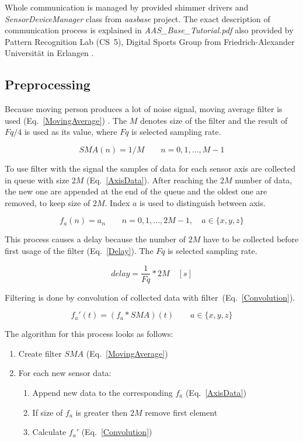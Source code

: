 \documentclass[conference]{IEEEtran}
\begin{document}
Whole communication is managed by provided shimmer drivers and \emph{SensorDeviceManager} class from \emph{aasbase} project. The exact description of communication process is explained in \emph{AAS\_Base\_Tutorial.pdf} also provided by Pattern Recognition Lab (CS~5), Digital Sports Group from Friedrich-Alexander Universität in Erlangen \cite{CS5}.


\subsection{Preprocessing}
Because moving person produces a lot of noise signal, moving average filter is used (Eq.~\ref{MovingAverage}) \cite{MovingAverage}.
The $M$ denotes size of the filter and the result of $Fq/4$ is used as its value, where $Fq$ is selected sampling rate.

\begin{equation}
	SMA(n) = 1/M\qquad  n = 0, 1, ..., M - 1
	\label{MovingAverage}
\end{equation}

To use filter with the signal the samples of data for each sensor axis are collected in queue with size  $2M$ (Eq.~\ref{AxisData}).
After reaching the $2M$ number of data, the new one are appended at the end of the queue and the oldest one are removed, to keep size of $2M$.
Index $a$ is used to distinguish between axis.

\begin{equation}
    f_a(n) = a_n\qquad n = 0, 1, ..., 2M - 1,\quad a \in \{x, y, z\}
    \label{AxisData}
\end{equation}

This process causes a delay because the number of $2M$ have to be collected before first usage of the filter (Eq.~\ref{Delay}). The $Fq$ is selected sampling rate.

\begin{equation}
    delay = \frac{1}{Fq} * 2M\quad[s]
    \label{Delay}
\end{equation}

Filtering is done by convolution of collected data with filter~(Eq.~\ref{Convolution}).

\begin{equation}
    f_a'(t) = (f_a \ast SMA)(t) \qquad a \in \{x, y, z\}
    \label{Convolution}
\end{equation}

The algorithm for this process looks as follows:
\begin{enumerate}
    \item Create filter $SMA$ (Eq.~\ref{MovingAverage})
    \item For each new sensor data:
    \begin{enumerate}
        \item Append new data to the corresponding $f_a$ (Eq.~\ref{AxisData})
        \item If size of $f_a$ is greater then $2M$ remove first element
        \item Calculate $f_a'$ (Eq.~\ref{Convolution})
    \end{enumerate}
\end{enumerate}
\end{document}
